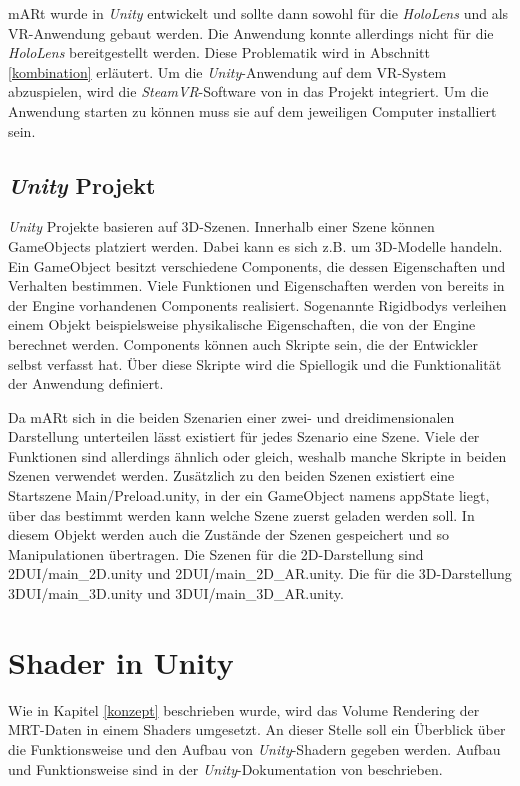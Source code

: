 mARt wurde in \textit{Unity} entwickelt und sollte dann sowohl für die \textit{HoloLens} und als VR-Anwendung gebaut werden. Die Anwendung konnte allerdings nicht für die \textit{HoloLens} bereitgestellt werden. Diese Problematik wird in Abschnitt \ref{kombination} erläutert.
Um die \textit{Unity}-Anwendung auf dem VR-System abzuspielen, wird die \textit{SteamVR}-Software von \cite{steam} in das Projekt integriert. Um die Anwendung starten zu können muss sie auf dem jeweiligen Computer installiert sein.

\subsection{\textit{Unity} Projekt}

\textit{Unity} Projekte basieren auf 3D-Szenen. Innerhalb einer Szene können GameObjects platziert werden. Dabei kann es sich z.B. um 3D-Modelle handeln. Ein GameObject besitzt verschiedene Components, die dessen Eigenschaften und Verhalten bestimmen. Viele Funktionen und Eigenschaften werden von bereits in der Engine vorhandenen Components realisiert. Sogenannte Rigidbodys verleihen einem Objekt beispielsweise physikalische Eigenschaften, die von der Engine berechnet werden. Components können auch Skripte sein, die der Entwickler selbst verfasst hat. Über diese Skripte wird die Spiellogik und die Funktionalität der Anwendung definiert. 

Da mARt sich in die beiden Szenarien einer zwei- und dreidimensionalen Darstellung unterteilen lässt existiert für jedes Szenario eine Szene.
Viele der Funktionen sind allerdings ähnlich oder gleich, weshalb manche Skripte in beiden Szenen verwendet werden. 
Zusätzlich zu den beiden Szenen existiert eine Startszene Main/Preload.unity, in der ein GameObject namens appState liegt, über das bestimmt werden kann welche Szene zuerst geladen werden soll. In diesem Objekt werden auch die Zustände der Szenen gespeichert und so Manipulationen übertragen.
Die Szenen für die 2D-Darstellung sind 2DUI/main\_2D.unity und 2DUI/main\_2D\_AR.unity. Die für die 3D-Darstellung 3DUI/main\_3D.unity und 3DUI/main\_3D\_AR.unity.



\section{Shader in Unity}

Wie in Kapitel \ref{konzept} beschrieben wurde, wird das Volume Rendering der MRT-Daten in einem Shaders umgesetzt. An dieser Stelle soll ein Überblick über die Funktionsweise und den Aufbau von \textit{Unity}-Shadern gegeben werden. Aufbau und Funktionsweise sind in der \textit{Unity}-Dokumentation von \cite{unityDoku} beschrieben.

